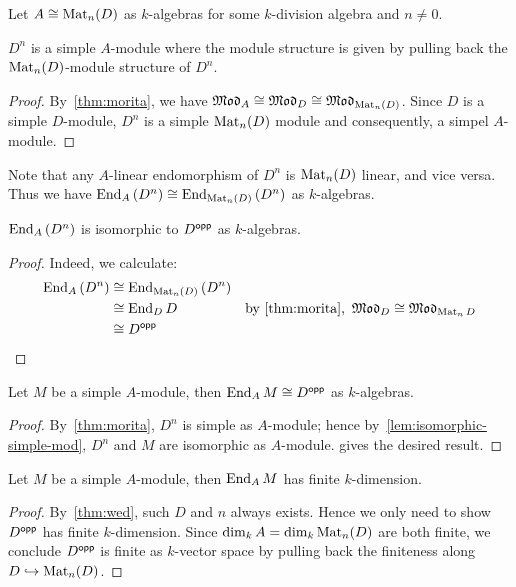 Let $A \cong \operatorname{Mat}_{n}(D)$ as $k$-algebras for some $k$-division algebra and $n\ne0$.

\begin{lemma}
  $D^{n}$ is a simple $A$-module where the module structure is given by pulling back the $\operatorname{Mat}_{n}(D)$-module structure of $D^{n}$.
  \leanok
\end{lemma}
\begin{proof}
  By~\cref{thm:morita}, we have $\operatorname{\mathfrak{Mod}}_{A}\cong\operatorname{\mathfrak{Mod}}_{D}\cong\operatorname{\mathfrak{Mod}}_{\operatorname{Mat}_{n}(D)}$. Since $D$ is a simple $D$-module, $D^{n}$ is a simple $\operatorname{Mat}_{n}(D)$ module and consequently, a simpel $A$-module.
\end{proof}

\begin{remark}
Note that any $A$-linear endomorphism of $D^{n}$ is $\operatorname{Mat}_{n}(D)$ linear, and vice versa. Thus we have $\operatorname{End}_{A}\left(D^{n}\right)\cong \operatorname{End}_{\operatorname{Mat}_{n}(D)}\left(D^{n}\right)$ as $k$-algebras.
\end{remark}

\begin{lemma}\label{lem:end-vec-iso}
  $\operatorname{End}_{A}\left(D^{n}\right)$ is isomorphic to $D^{\mathsf{opp}}$ as $k$-algebras.
  \leanok
\end{lemma}

\begin{proof}
  Indeed, we calculate:
  \[
    \begin{aligned}
      \End_{A}\left(D^{n}\right) &\cong \End_{\Mat_{n}(D)}\left(D^{n}\right) & \\
                                 &\cong \End_{D}D & \text{by~\cref{thm:morita},}~\MOD_{D}\cong\MOD_{\Mat_{n}D}\\
      &\cong D^{\opp}
    \end{aligned}
  \]
\end{proof}

\begin{lemma}\label{lem:end-simple-iso}
  Let $M$ be a simple $A$-module, then $\operatorname{End}_{A} M\cong D^{\mathsf{opp}}$ as $k$-algebras.
  \leanok
\end{lemma}
\begin{proof}
  By~\cref{thm:morita}, $D^{n}$ is simple as $A$-module; hence by~\cref{lem:isomorphic-simple-mod}, $D^{n}$ and $M$ are isomorphic as $A$-module.  gives the desired result.
\end{proof}

\begin{lemma}
  Let $M$ be a simple $A$-module, then $\operatorname{End}_{A}M$ has finite $k$-dimension.
  \leanok
\end{lemma}
\begin{proof}
  By~\cref{thm:wed}, such $D$ and $n$ always exists. Hence we only need to show $D^{\mathsf{opp}}$ has finite $k$-dimension. Since $\dim_{k}A=\dim_{k}\operatorname{Mat}_{n}(D)$ are both finite, we conclude $D^{\mathsf{opp}}$ is finite as $k$-vector space by pulling back the finiteness along $D \hookrightarrow \operatorname{Mat}_{n}(D)$.
\end{proof}

